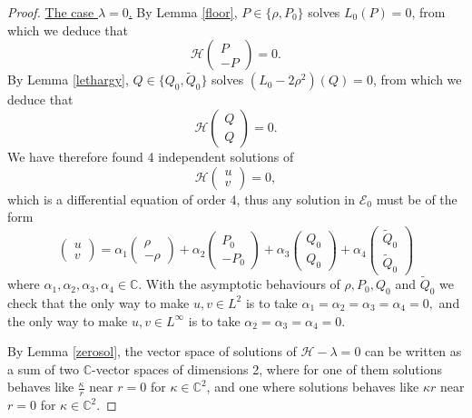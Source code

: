 \documentclass[11 pt]{amsart}
\newcommand{\tmem}{\underline}
\theoremstyle{definition}
\theoremstyle{remark}
\numberwithin{equation}{section}
\begin{document}
\begin{proof}
  {\tmem{The case $\lambda = 0$.}}
  By Lemma \ref{floor}, $P \in \{ \rho, P_0 \}$ solves $L_0 (P) = 0$, from
  which we deduce that
  \[ \mathcal{H} \left(\begin{array}{c}
       P\\
       - P
     \end{array}\right) = 0. \]
  By Lemma \ref{lethargy}, $Q \in \{ Q_0, \widetilde{Q}_0 \}$ solves $(L_0 - 2
  \rho^2) (Q) = 0$, from which we deduce that
  \[ \mathcal{H} \left(\begin{array}{c}
       Q\\
       Q
     \end{array}\right) = 0. \]
  We have therefore found 4 independent solutions of
  \[ \mathcal{H} \left(\begin{array}{c}
       u\\
       v
     \end{array}\right) = 0, \]
  which is a differential equation of order 4, thus any solution in
  $\mathcal{E}_0$ must be of the form
  \[ \left(\begin{array}{c}
       u\\
       v
     \end{array}\right) = \alpha_1 \left(\begin{array}{c}
       \rho\\
       - \rho
     \end{array}\right) + \alpha_2 \left(\begin{array}{c}
       P_0\\
       - P_0
     \end{array}\right) + \alpha_3 \left(\begin{array}{c}
       Q_0\\
       Q_0
     \end{array}\right) + \alpha_4 \left(\begin{array}{c}
       \widetilde{Q}_0\\
       \widetilde{Q}_0
     \end{array}\right) \]
  where $\alpha_1, \alpha_2, \alpha_3, \alpha_4 \in \mathbb{C}$. With the
  asymptotic behaviours of $\rho, P_0, Q_0$ and $\widetilde{Q}_0$ we check that
  the only way to make $u, v \in L^2$ is to take $\alpha_1 = \alpha_2 =
  \alpha_3 = \alpha_4 = 0,$ and the only way to make $u, v \in L^{\infty}$ is
  to take $\alpha_2 = \alpha_3 = \alpha_4 = 0$.
  
\medskip
  
\noindent  {\tmem{The case $\lambda > 0$.}} By Lemma \ref{zerosol}, the vector
  space of solutions of $\mathcal{H}- \lambda = 0$ can be written as a sum of
  two $\mathbb{C}$-vector spaces of dimensions 2, where for one of them
  solutions behaves like $\frac{\kappa}{r}$ near $r = 0$ for $\kappa \in
  \mathbb{C}^2$, and one where solutions behaves like $\kappa r$ near $r = 0$
  for $\kappa \in \mathbb{C}^2$.
  

\end{proof}
\end{document}
